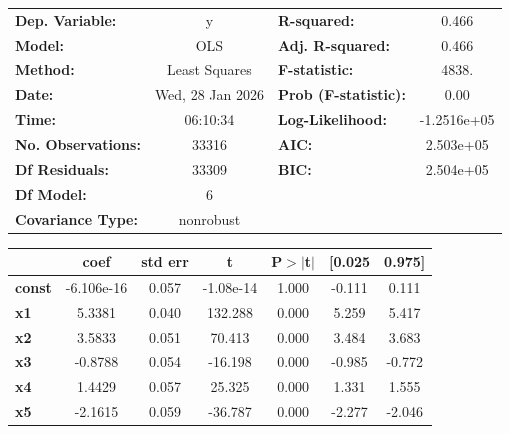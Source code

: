 \begin{center}
\begin{tabular}{lclc}
\toprule
\textbf{Dep. Variable:}    &        y         & \textbf{  R-squared:         } &      0.466   \\
\textbf{Model:}            &       OLS        & \textbf{  Adj. R-squared:    } &      0.466   \\
\textbf{Method:}           &  Least Squares   & \textbf{  F-statistic:       } &      4838.   \\
\textbf{Date:}             & Wed, 28 Jan 2026 & \textbf{  Prob (F-statistic):} &      0.00    \\
\textbf{Time:}             &     06:10:34     & \textbf{  Log-Likelihood:    } & -1.2516e+05  \\
\textbf{No. Observations:} &       33316      & \textbf{  AIC:               } &  2.503e+05   \\
\textbf{Df Residuals:}     &       33309      & \textbf{  BIC:               } &  2.504e+05   \\
\textbf{Df Model:}         &           6      & \textbf{                     } &              \\
\textbf{Covariance Type:}  &    nonrobust     & \textbf{                     } &              \\
\bottomrule
\end{tabular}
\begin{tabular}{lcccccc}
               & \textbf{coef} & \textbf{std err} & \textbf{t} & \textbf{P$> |$t$|$} & \textbf{[0.025} & \textbf{0.975]}  \\
\midrule
\textbf{const} &   -6.106e-16  &        0.057     & -1.08e-14  &         1.000        &       -0.111    &        0.111     \\
\textbf{x1}    &       5.3381  &        0.040     &   132.288  &         0.000        &        5.259    &        5.417     \\
\textbf{x2}    &       3.5833  &        0.051     &    70.413  &         0.000        &        3.484    &        3.683     \\
\textbf{x3}    &      -0.8788  &        0.054     &   -16.198  &         0.000        &       -0.985    &       -0.772     \\
\textbf{x4}    &       1.4429  &        0.057     &    25.325  &         0.000        &        1.331    &        1.555     \\
\textbf{x5}    &      -2.1615  &        0.059     &   -36.787  &         0.000        &       -2.277    &       -2.046     \\

\end{tabular}
\end{center}
